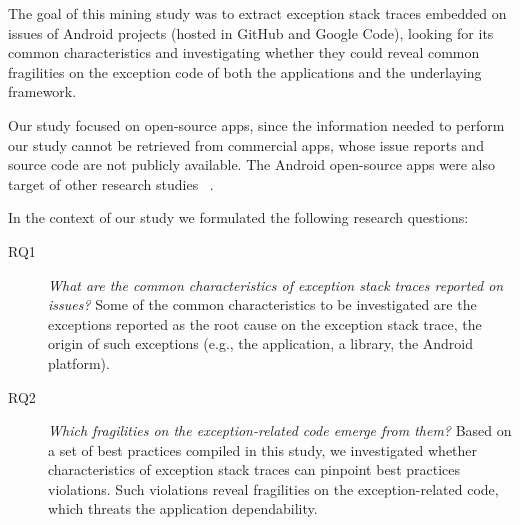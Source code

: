 \documentclass[conference]{IEEEtran}
\begin{document}

The goal of this mining study was to extract exception stack traces embedded on issues of Android projects 
(hosted in GitHub and Google Code), looking for its 
common characteristics and investigating whether
 they could reveal common fragilities on the exception code of both the 
applications and the underlaying  framework. 

Our study focused on open-source apps, since the information needed to perform our study
cannot be retrieved from commercial apps, whose issue reports and 
source code are not publicly available. The Android open-source apps were also 
target of other research studies ~\cite{Linar13,ahimed}.   


In the context of our study we formulated the following research questions:

\begin{description}

  \item[RQ1] \noindent\emph{What are the common characteristics of exception stack traces reported on issues?} 
Some of the common characteristics to be investigated are the exceptions reported as the root cause on
the exception stack trace, the origin of such exceptions (e.g., the application, a library, the Android platform). 


  \item[RQ2] \noindent\emph{Which fragilities on the exception-related code emerge from them?}
Based on a set of best practices compiled in this study, we investigated whether characteristics of exception stack traces  
can pinpoint best practices violations. Such  violations reveal fragilities
on the exception-related code, which threats the application dependability.

\end{description}
\end{document}

